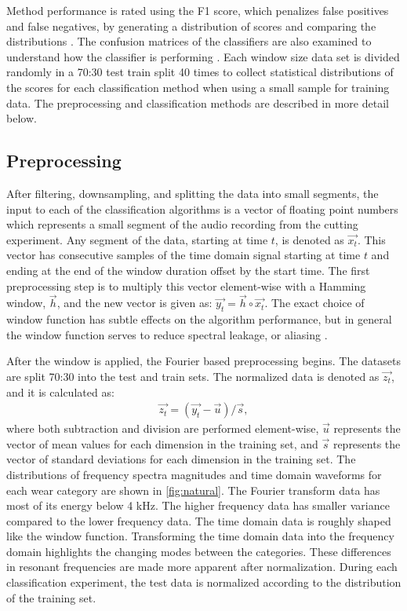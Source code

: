 Method performance is rated using the F1 score, which penalizes false positives and false negatives,
by generating a distribution of scores and comparing the distributions \cite{Goutte2005}.
The confusion matrices of the classifiers are also examined to understand 
how the classifier is performing \cite{Bramer2007}.
Each window size data set is divided randomly in a 70:30 test train split 40 times 
to collect statistical distributions of the scores for each classification method 
when using a small sample for training data.
The preprocessing and classification methods are described in more detail below.

\subsection{Preprocessing}

After filtering, downsampling, and splitting the data into small segments,
the input to each of the classification algorithms is a vector of floating point numbers 
which represents a small segment of the audio recording from the cutting experiment. 
Any segment of the data, starting at time $t$, is denoted as $\vec{x_t}$.
This vector has consecutive samples of the time domain signal starting at time $t$ and 
ending at the end of the window duration offset by the start time.
The first preprocessing step is to multiply this vector element-wise with a Hamming window, $\vec{h}$, and
the new vector is given as: $\vec{y_t} = \vec{h} \circ \vec{x_t}$.
The exact choice of window function has subtle effects on the algorithm performance, 
but in general the window function serves to reduce spectral leakage, or aliasing \cite{Harris1978}. 

After the window is applied, the Fourier based preprocessing begins.
The datasets are split 70:30 into the test and train sets. 
The normalized data is denoted as $\vec{z_t}$, and it is calculated as:
\begin{align}
\vec{z_t} = (\vec{y_t} - \vec{u}) / \vec{s},
\end{align}
where both subtraction and division are performed element-wise, $\vec{u}$ represents the vector
of mean values for each dimension in the training set, 
and $\vec{s}$ represents the vector of standard deviations for each
dimension in the training set. 
The distributions of frequency spectra magnitudes and time domain waveforms
for each wear category are shown in \ref{fig:natural}.
The Fourier transform data has most of its energy below 4 kHz.
The higher frequency data has smaller variance compared to the
lower frequency data.
The time domain data is roughly shaped like the window function.
Transforming the time domain data into the frequency domain highlights
the changing modes between the categories.
These differences in resonant frequencies are made more apparent after normalization.
During each classification experiment, 
the test data is normalized according to the distribution of the training set.

